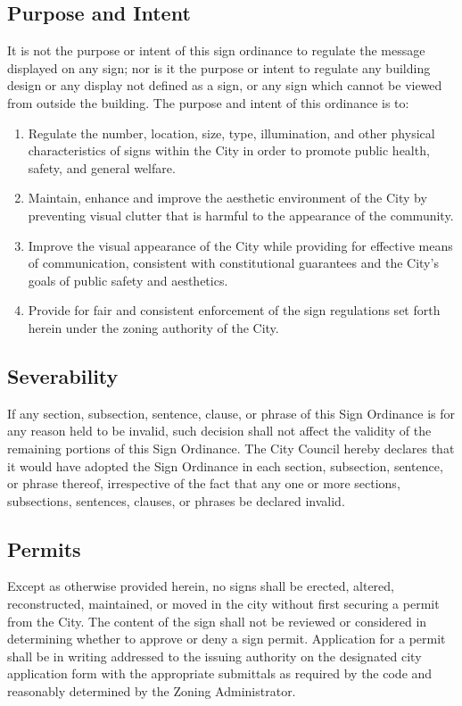 \subsection{Purpose and Intent}
It is not the purpose or intent of this sign ordinance to regulate the message displayed on any sign; nor is it the purpose or intent to regulate any building design or any display not defined as a sign, or any sign which cannot be viewed from outside the building.  The purpose and intent of this ordinance is to:
\begin{enumerate}[{\indent}1)]
    \item Regulate the number, location, size, type, illumination, and other physical characteristics of signs within the City in order to promote public health, safety, and general welfare.
    \item Maintain, enhance and improve the aesthetic environment of the City by preventing visual clutter that is harmful to the appearance of the community.
    \item Improve the visual appearance of the City while providing for effective means of communication, consistent with constitutional guarantees and the City’s goals of public safety and aesthetics.
    \item Provide for fair and consistent enforcement of the sign regulations set forth herein under the zoning authority of the City.
\end{enumerate}
\subsection{Severability}
If any section, subsection, sentence, clause, or phrase of this Sign Ordinance is for any reason held to be invalid, such decision shall not affect the validity of the remaining portions of this Sign Ordinance.  The City Council hereby declares that it would have adopted the Sign Ordinance in each section, subsection, sentence, or phrase thereof, irrespective of the fact that any one or more sections, subsections, sentences, clauses, or phrases be declared invalid.
\subsection{Permits}
Except as otherwise provided herein, no signs shall be erected, altered, reconstructed, maintained, or moved in the city without first securing a permit from the City.  The content of the sign shall not be reviewed or considered in determining whether to approve or deny a sign permit.  Application for a permit shall be in writing addressed to the issuing authority on the designated city application form with the appropriate submittals as required by the code and reasonably determined by the Zoning Administrator.
